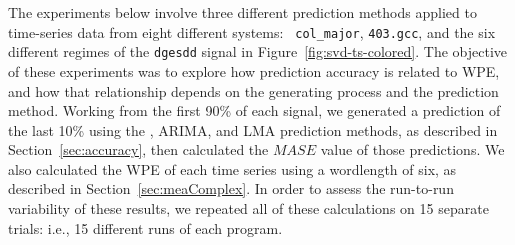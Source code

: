 







The experiments below involve three different prediction methods
applied to time-series data from eight different systems: {\tt
  col\_major}, {\tt 403.gcc}, and the six different regimes of the
{\tt dgesdd} signal in Figure~\ref{fig:svd-ts-colored}.  The objective of these
experiments was to explore how prediction accuracy is related to WPE,
and how that relationship depends on the generating process and the
prediction method.  Working from the first 90\% of each signal, we
generated a prediction of the last 10\% using the \naive, ARIMA, and
LMA prediction methods, as described in Section~\ref{sec:accuracy},
then calculated the $MASE$ value of those predictions.  We also
calculated the WPE of each time series using a wordlength of six, as
described in Section~\ref{sec:meaComplex}.  In order to assess the
run-to-run variability of these results, we repeated all of these
calculations on 15 separate trials: i.e., 15 different runs of each
program.  


